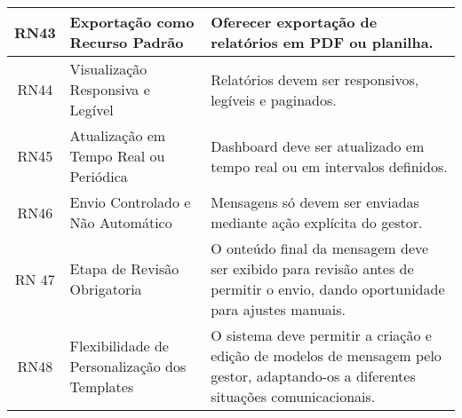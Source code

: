\begin{longtable}{|c|>{\raggedright\arraybackslash}p{6cm}|>{\raggedright\arraybackslash}p{8cm}|}
\hline
RN43 & Exportação como Recurso Padrão & Oferecer exportação de relatórios em PDF ou planilha. \\
\hline
RN44 & Visualização Responsiva e Legível & Relatórios devem ser responsivos, legíveis e paginados. \\
\hline
RN45 & Atualização em Tempo Real ou Periódica & Dashboard deve ser atualizado em tempo real ou em intervalos definidos. \\
\hline
RN46 & Envio Controlado e Não Automático & Mensagens só devem ser enviadas mediante ação explícita do gestor. \\
\hline
RN 47 & Etapa de Revisão Obrigatoria & O onteúdo final da mensagem deve ser exibido para revisão antes de permitir o envio, dando oportunidade para ajustes manuais. \\
\hline
RN48 & Flexibilidade de Personalização dos Templates & O sistema deve permitir a criação e edição de modelos de mensagem pelo gestor, adaptando-os a diferentes situações comunicacionais. \\
\end{longtable}
